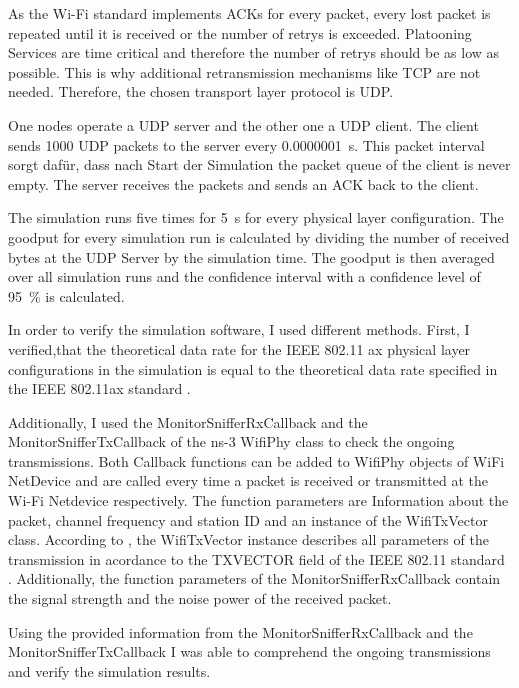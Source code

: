 As the Wi-Fi standard implements ACKs for every packet, every lost packet is repeated until it is received or the number of retrys is
exceeded. Platooning Services are time critical and therefore the number of retrys should be as low as possible. This is why additional
retransmission mechanisms like TCP are not needed. Therefore, the chosen transport layer protocol is UDP.

One nodes operate a UDP server and the other one a UDP client. The client sends \SI{1000}{\byte} UDP packets to the server every \SI{0.0000001}{\second}. This packet interval
sorgt dafür, dass nach Start der Simulation the packet queue of the client is never empty. The server receives the packets and sends an ACK back to the client.

The simulation runs five times for \SI{5}{\second} for every physical layer configuration.
The goodput for every simulation run is calculated by dividing the number of received bytes at the UDP Server by the simulation time.
The goodput is then averaged over all simulation runs and the confidence interval with a confidence level of
\SI{95}{\percent} is calculated.

In order to verify the simulation software, I used different methods. First, I verified,that the theoretical data rate for the IEEE 802.11 ax physical layer configurations in
the simulation is equal to the theoretical data rate specified in the IEEE 802.11ax standard \cite{noauthor_ieee_2021}.

Additionally, I used the MonitorSnifferRxCallback and the MonitorSnifferTxCallback of the ns-3 WifiPhy class to check the ongoing transmissions.
Both Callback functions can be added to WifiPhy objects of WiFi NetDevice and are called every time a packet is received or transmitted at the Wi-Fi Netdevice respectively.
The function parameters are Information about the packet, channel frequency and station ID and an instance of the WifiTxVector class. According to \cite{ClassReference}, the WifiTxVector instance describes all parameters of the transmission in
acordance to the TXVECTOR field of the IEEE 802.11 standard \cite{noauthor_ieee_2021}. Additionally, the function parameters of the MonitorSnifferRxCallback contain the signal strength and
the noise power of the received packet.

Using the provided information from the MonitorSnifferRxCallback and the MonitorSnifferTxCallback I was able to comprehend the ongoing transmissions and
verify the simulation results.
